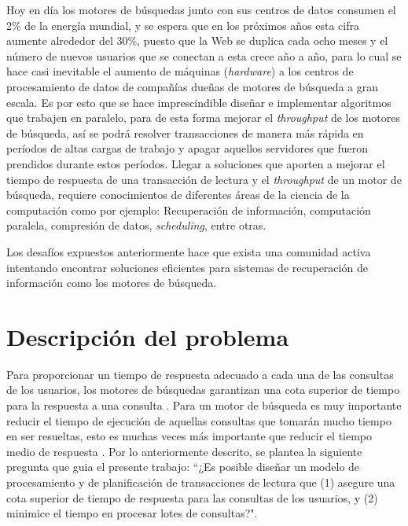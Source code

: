 Hoy en día los motores de búsquedas junto con sus centros de datos consumen el 2\% de la energía mundial, y se espera que en los próximos años esta cifra aumente alrededor del 30\%, puesto que la Web se duplica cada ocho meses y el número de nuevos usuarios que se conectan a esta crece año a año, para lo cual se hace casi inevitable el aumento de máquinas (\textit{hardware}) a los centros de procesamiento de datos de compañías dueñas de motores de búsqueda a gran escala. Es por esto que se hace imprescindible diseñar e implementar algoritmos que trabajen en paralelo, para de esta forma mejorar el \textit{throughput} de los motores de búsqueda, así se podrá resolver transacciones de manera más rápida en períodos de altas cargas de trabajo y apagar aquellos servidores que fueron prendidos durante estos períodos. Llegar a soluciones que aporten a mejorar el tiempo de respuesta de una transacción de lectura y el \textit{throughput} de un motor de búsqueda, requiere conocimientos de diferentes áreas de la ciencia de la computación como por ejemplo: Recuperación de información, computación paralela, compresión de datos, \textit{scheduling}, entre otras. 

Los desafíos expuestos anteriormente hace que exista una comunidad activa intentando encontrar soluciones eficientes para sistemas de recuperación de información como los motores de búsqueda.  

\section{Descripci\'on del problema}
\label{intro:problema}
Para proporcionar un tiempo de respuesta adecuado a cada una de las consultas de los usuarios, los motores de búsquedas garantizan una cota superior de tiempo para la respuesta a una consulta \citep{Jeon:2014}. Para un motor de búsqueda es muy importante reducir el tiempo de ejecución de aquellas consultas que tomarán mucho tiempo en ser resueltas, esto es muchas veces más importante que reducir el tiempo medio de respuesta \citep{Dean:2013}. Por lo anteriormente descrito, se plantea la siguiente pregunta que guia el presente trabajo: ``¿Es posible diseñar un modelo de procesamiento y de planificación de transacciones de lectura que (1) asegure una cota superior de tiempo de respuesta para las consultas de los usuarios, y (2) minimice el tiempo en procesar lotes de consultas?".  

